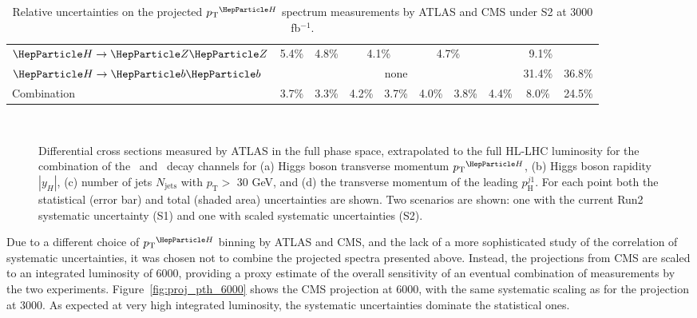 \begin{table}[th]
{\begin{tabular}{l|cccccccc|c|c|c|c|c|c|c|c}
    $\hzz$       & \multicolumn{4}{c|}{5.4\%} & \multicolumn{4}{c|}{4.8\%} & \multicolumn{3}{c|}{4.1\%} & \multicolumn{2}{c|}{4.7\%} & \multicolumn{3}{c}{9.1\%}                                                               \\ 
    $\hbb$       & \multicolumn{14}{c|}{none} & 31.4\%                     & 36.8\%                                                                                                                                            \\ 
    Combination  & \multicolumn{4}{c|}{3.7\%} & \multicolumn{4}{c|}{3.3\%} & 4.2\%                      & \multicolumn{2}{c|}{3.7\%} & 4.0\%  & 3.8\%   & 4.4\%   & 8.0\%   & 24.5\%                                           \\
    \hline
  \end{tabular}
  }
  \caption{Relative uncertainties on the projected $\pTH$ spectrum measurements by ATLAS and CMS under S2 at 3000 fb$^{-1}$.}
  \label{tab:proj_pth_unc_scen2}
\end{table}

\begin{figure}
  \centering
   \\
  \caption{Differential cross sections measured by ATLAS in the full phase space, extrapolated to the full HL-LHC luminosity for the combination of the \Hyy\ and \HZZ\ decay channels for (a) Higgs boson transverse momentum $\pTH$, (b) Higgs boson rapidity $|y_H|$, (c) number of jets $N_{\mathrm{jets}}$ with  $p_{\mathrm{T}} >$ 30 GeV, and (d) the transverse momentum of the leading $p_{\mathrm{H}}^{j1}$. For each point both the statistical (error bar) and total (shaded area) uncertainties are shown. Two scenarios are shown: one with the current Run2 systematic uncertainty (S1) and one with scaled systematic uncertainties (S2).}
   \label{fig:ATLAS_proj_differential}
\end{figure}

Due to a different choice of $\pTH$ binning by ATLAS and CMS, and the lack of a more sophisticated study of the correlation of systematic uncertainties, it was chosen not to combine the projected spectra presented above. Instead, the projections from CMS are scaled to an integrated luminosity of 6000\fbinv, providing a proxy estimate of the overall sensitivity of an eventual combination of measurements by the two experiments. Figure~\ref{fig:proj_pth_6000} shows the CMS projection at 6000\fbinv, with the same systematic scaling as for the projection at 3000\fbinv.  As expected at very high integrated luminosity, the systematic uncertainties dominate the statistical ones.

